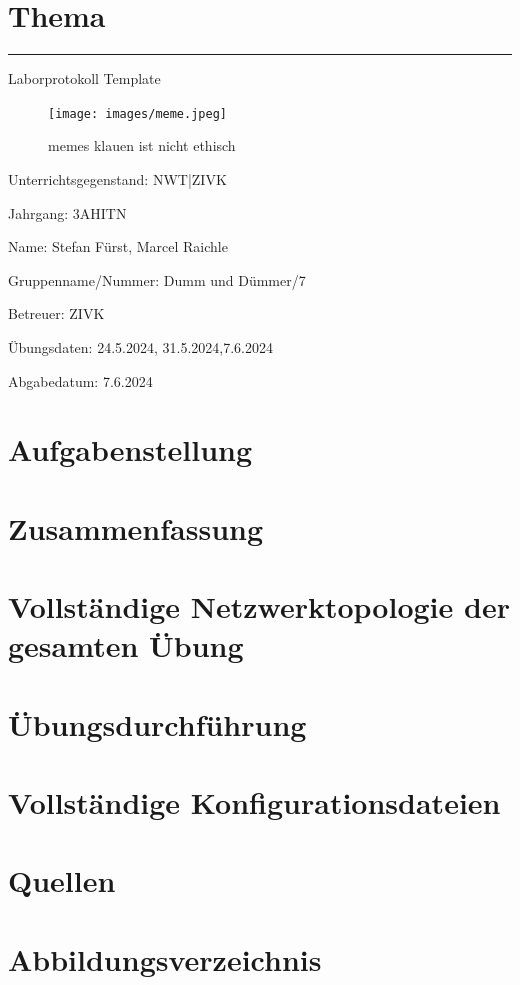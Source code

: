 \documentclass[a4paper]{article}
\begin{document}

\pagestyle{oida}
\section*{Thema}
\par\noindent\rule{\textwidth}{0.4pt}

Laborprotokoll
Template

\begin{figure}[h]
	\texttt{[image: images/meme.jpeg]}
	\caption{memes klauen ist nicht ethisch}
\end{figure}

\vspace*{\fill}
Unterrichtsgegenstand:	NWT|ZIVK

Jahrgang:	3AHITN

Name:	Stefan Fürst, Marcel Raichle

Gruppenname/Nummer: Dumm und Dümmer/7

Betreuer: 	ZIVK

Übungsdaten:	24.5.2024, 31.5.2024,7.6.2024

Abgabedatum:	7.6.2024


\newpage
\tableofcontents

\newpage

\section{Aufgabenstellung}



\section{Zusammenfassung}

\newpage

\section{Vollständige Netzwerktopologie der gesamten Übung}

\newpage

\section{Übungsdurchführung}


\newpage

\section{Vollständige Konfigurationsdateien}

\newpage

\section{Quellen}

\newpage
\section{Abbildungsverzeichnis}

\listoffigures
\end{document}
